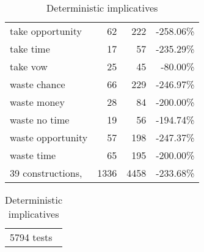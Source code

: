 \begin{table}[ht]
\begin{small}
\begin{tabular}{lrrr}
take opportunity & 62 & 222 & -258.06\%\\
take time & 17 & 57 & -235.29\%\\
take vow & 25 & 45 & -80.00\%\\
waste chance & 66 & 229 & -246.97\%\\
waste money & 28 & 84 & -200.00\%\\
waste no time & 19 & 56 & -194.74\%\\
waste opportunity & 57 & 198 & -247.37\%\\
waste time & 65 & 195 & -200.00\%\\
\hline\hline
39 constructions, & 1336 & 4458 & -233.68\%\\
\end{tabular}
\begin{tabular}{l}
5794 tests\\
\end{tabular}
\caption {Deterministic implicatives}
\end{small}
\end{table}
